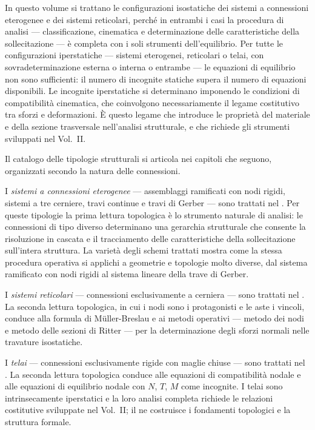 In questo volume si trattano le configurazioni
isostatiche dei sistemi a connessioni eterogenee e
dei sistemi reticolari, perché in entrambi i casi
la procedura di analisi --- classificazione,
cinematica e determinazione delle caratteristiche
della sollecitazione --- è completa con i soli
strumenti dell'equilibrio. Per tutte le configurazioni
iperstatiche --- sistemi eterogenei, reticolari o
telai, con sovradeterminazione esterna o interna
o entrambe --- le equazioni di equilibrio non sono
sufficienti: il numero di incognite statiche supera
il numero di equazioni disponibili. Le incognite
iperstatiche si determinano imponendo le condizioni
di compatibilità cinematica, che coinvolgono
necessariamente il legame costitutivo tra sforzi
e deformazioni. È questo legame che introduce le
proprietà del materiale e della sezione trasversale
nell'analisi strutturale, e che richiede gli
strumenti sviluppati nel Vol.~II.

Il catalogo delle tipologie strutturali si articola
nei capitoli che seguono, organizzati secondo la
natura delle connessioni.

I \emph{sistemi a connessioni eterogenee} ---
assemblaggi ramificati con nodi rigidi, sistemi a tre
cerniere, travi continue e travi di Gerber 
--- sono trattati nel .
Per queste tipologie la prima lettura topologica
è lo strumento naturale di analisi: le connessioni
di tipo diverso determinano una gerarchia
strutturale che consente la risoluzione in cascata
e il tracciamento delle caratteristiche della
sollecitazione sull'intera struttura. La varietà
degli schemi trattati mostra come la stessa
procedura operativa si applichi a geometrie e
topologie molto diverse, dal sistema ramificato con nodi
rigidi al sistema lineare della
trave di Gerber.

I \emph{sistemi reticolari} --- connessioni
esclusivamente a cerniera --- sono trattati nel
. La seconda lettura
topologica, in cui i nodi sono i protagonisti
e le aste i vincoli, conduce alla formula di
Müller-Breslau e ai metodi operativi --- metodo
dei nodi e metodo delle sezioni di Ritter ---
per la determinazione degli sforzi normali nelle
travature isostatiche.

I \emph{telai} --- connessioni esclusivamente
rigide con maglie chiuse --- sono trattati nel
. La seconda lettura topologica
conduce alle equazioni di compatibilità nodale e
alle equazioni di equilibrio nodale con $N$, $T$,
$M$ come incognite. I telai sono intrinsecamente
iperstatici e la loro analisi completa richiede
le relazioni costitutive sviluppate nel Vol.~II;
il  ne costruisce i fondamenti
topologici e la struttura formale.

